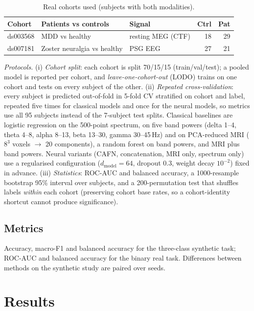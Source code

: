 \documentclass{ieeeaccessapprox}
\begin{document}
\begin{table}[!t]
\caption{Real cohorts used (subjects with both modalities).}
\label{tab:cohorts}
\centering\scriptsize\setlength{\tabcolsep}{3pt}
\begin{tabular}{@{}lllrr@{}}
\toprule
Cohort & Patients vs controls & Signal & Ctrl & Pat\\
\midrule
ds003568 & MDD vs healthy & resting MEG (CTF) & 18 & 29\\
ds007181 & Zoster neuralgia vs healthy & PSG EEG & 27 & 21\\
\bottomrule
\end{tabular}
\end{table}

\emph{Protocols.} (i) \emph{Cohort split}: each cohort is split 70/15/15 (train/val/test); a pooled model is reported per cohort, and \emph{leave-one-cohort-out} (LODO) trains on one cohort and tests on every subject of the other. (ii) \emph{Repeated cross-validation}: every subject is predicted out-of-fold in 5-fold CV stratified on cohort and label, repeated five times for classical models and once for the neural models, so metrics use all 95 subjects instead of the 7-subject test splits. Classical baselines are logistic regression on the 500-point spectrum, on five band powers (delta 1--4, theta 4--8, alpha 8--13, beta 13--30, gamma 30--45\,Hz) and on PCA-reduced MRI ($8^3$ voxels $\to$ 20 components), a random forest on band powers, and MRI plus band powers. Neural variants (CAFN, concatenation, MRI only, spectrum only) use a regularised configuration ($d_{\mathrm{model}}=64$, dropout 0.3, weight decay $10^{-2}$) fixed in advance. (iii) \emph{Statistics}: ROC-AUC and balanced accuracy, a 1000-resample bootstrap 95\% interval over subjects, and a 200-permutation test that shuffles labels \emph{within} each cohort (preserving cohort base rates, so a cohort-identity shortcut cannot produce significance).

\subsection{Metrics}
Accuracy, macro-F1 and balanced accuracy for the three-class synthetic task; ROC-AUC and balanced accuracy for the binary real task. Differences between methods on the synthetic study are paired over seeds.

\section{Results}\label{sec:results}
\end{document}
